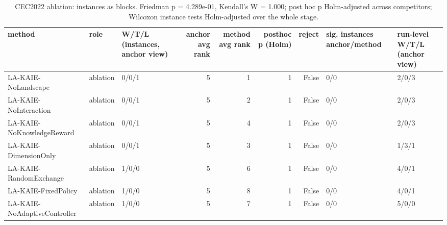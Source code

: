 \begin{table}[t]
\centering
\scriptsize
\caption{CEC2022 ablation: instances as blocks. Friedman p = 4.289e-01, Kendall's W = 1.000; post hoc p Holm-adjusted across competitors; Wilcoxon instance tests Holm-adjusted over the whole stage.}
\label{tab:cec2022_ablation_global}
\begin{tabular}{lllrrrrll}
\toprule
method & role & W/T/L (instances, anchor view) & anchor avg rank & method avg rank & posthoc p (Holm) & reject & sig. instances anchor/method & run-level W/T/L (anchor view) \\
\midrule
LA-KAIE-NoLandscape & ablation & 0/0/1 & 5 & 1 & 1 & False & 0/0 & 2/0/3 \\
LA-KAIE-NoInteraction & ablation & 0/0/1 & 5 & 2 & 1 & False & 0/0 & 2/0/3 \\
LA-KAIE-NoKnowledgeReward & ablation & 0/0/1 & 5 & 4 & 1 & False & 0/0 & 2/0/3 \\
LA-KAIE-DimensionOnly & ablation & 0/0/1 & 5 & 3 & 1 & False & 0/0 & 1/3/1 \\
LA-KAIE-RandomExchange & ablation & 1/0/0 & 5 & 6 & 1 & False & 0/0 & 4/0/1 \\
LA-KAIE-FixedPolicy & ablation & 1/0/0 & 5 & 8 & 1 & False & 0/0 & 4/0/1 \\
LA-KAIE-NoAdaptiveController & ablation & 1/0/0 & 5 & 7 & 1 & False & 0/0 & 5/0/0 \\
\bottomrule
\end{tabular}
\end{table}
